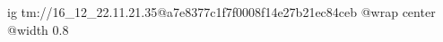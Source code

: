  
 
 
 
 

\qqSecOrig


\ifcmt
  ig tm://16_12_22.11.21.35@a7e8377c1f7f0008f14e27b21ec84ceb
  @wrap center
  @width 0.8
\fi

